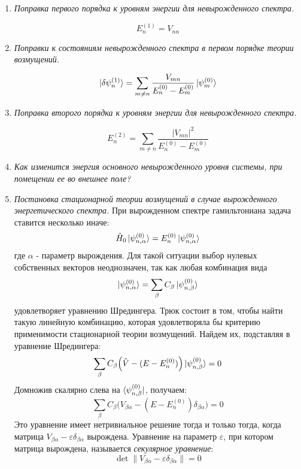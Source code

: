 \documentclass{article}
\begin{document}
\begin{enumerate}
		\item \textit{Поправка первого порядка к уровням энергии для невырожденного спектра.}
		
		\begin{equation}
			E_{n}^{(1)} = V_{nn}
		\end{equation}
		\item \textit{Поправки к состояниям невырожденного спектра в первом порядке теории возмущений.}
		
		\begin{equation}
			\ket{\delta\psi_n^{(1)}} = \sum\limits_{m\neq n} \frac{V_{mn}}{E_n^{(0)} - E_m^{(0)}} \ket{\psi_m^{(0)}}
		\end{equation}
		
		\item \textit{Поправка второго порядка к уровням энергии для невырожденного спектра.}
		
		\begin{equation}
			E_n^{(2)} = \sum\limits_{m\neq n} \frac{|V_{mn}|^2}{E_n^{(0)} - E_m^{(0)}}
		\end{equation}	
		
		\item \textit{Как изменится энергия основного невырожденного уровня системы, при помещении ее во внешнее поле?}	
		
		\item \textit{Постановка стационарной теории возмущений в случае вырожденного энергетического спектра.}
		При вырожденном спектре гамильтониана задача ставится несколько иначе:
		\begin{equation}
			\hat{H}_0 \ket{\psi^{(0)}_{n,\alpha}} = E_n^{(0)}\ket{\psi^{(0)}_{n,\alpha}}
		\end{equation}
		где $\alpha$ - параметр вырождения. Для такой ситуации выбор нулевых собственных векторов неоднозначен, так как любая комбинация вида
		\begin{equation}
			\ket{\psi^{(0)}_{n,\alpha}} = \sum\limits_{\beta} C_\beta \ket{\psi^{(0)}_{n,\beta}} 
		\end{equation}
		удовлетворяет уравнению Шредингера. Трюк состоит в том, чтобы найти такую линейную комбинацию, которая удовлетворяла бы критерию применимости стационарной теории возмущений. Найдем их, подставляя в уравнение Шредингера:
		\begin{equation}
			\sum\limits_{\beta} C_\beta \Big( \hat{V} - (E - E_n^{(0)}) \Big) \ket{\psi_{n,\beta}^{(0)}} = 0
		\end{equation}
		Домножив скалярно слева на $\bra{\psi_{n,\beta}^{(0)}}$, получаем:
		\begin{equation}
			\sum\limits_{\beta} C_\beta \Big( V_{\beta\alpha} - (E - E_n^{(0)})\delta_{\beta\alpha} \Big) = 0
		\end{equation}
		Это уравнение имеет нетривиальное решение тогда и только тогда, когда матрица $V_{\beta\alpha} - \varepsilon \delta_{\beta\alpha}$ вырождена. Уравнение на параметр $\varepsilon$, при котором матрица вырождена, называется \textit{секулярное уравнение}:
		\begin{equation}
			\det \|V_{\beta\alpha} - \varepsilon \delta_{\beta\alpha}\| = 0
		\end{equation}
		

\end{enumerate}
\end{document}
